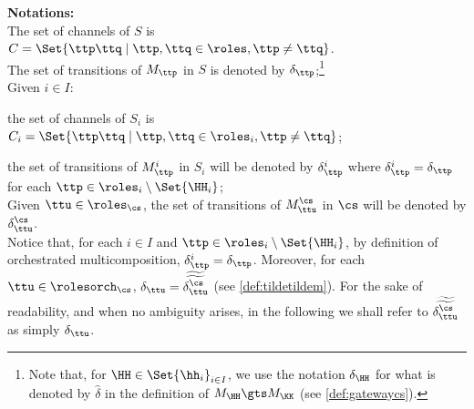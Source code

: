 
\medskip


\noindent
\textbf{Notations:} \\
The set of channels of $S$ is $C=\Set{\ttp\ttq \mid \ttp,\ttq\in \roles, \ttp\neq\ttq}$.\\
The set of transitions of $M_\ttp$ in $S$ is denoted by $\delta_\ttp$;\footnote{Note that,
for $\HH \in \Set{\hh_i}_{i\in I}$, we use the notation
$\delta_{\HH}$ for what is denoted by $\widehat\delta$ 
in the definition of $M_{\HH}\gts M_{\KK}$ (see \cref{def:gatewaycs}).}\\
Given $i\in I$:

the set of channels of $S_i$ is $C_i=\Set{\ttp\ttq \mid \ttp,\ttq\in \roles_i, \ttp\neq\ttq}$;

the set of transitions of $M^i_\ttp$ in $S_i$ will be denoted by $\delta^i_\ttp$
 where $\delta^i_\ttp = \delta_\ttp$ for each $\ttp\in\roles_i\setminus\Set{\HH_i}$;\\
Given $\ttu\in\roles_{\cs}$, the set of transitions of 
$M^{\cs}_{\ttu}$ in $\cs$ will be denoted by $\delta^\cs_{\ttu}$.\\

\noindent
Notice that, for each $i\in I$ and $\ttp\in\roles_i\setminus\Set{\HH_i}$, by definition of orchestrated multicomposition, $\delta^i_\ttp = \delta_\ttp$. 
 Moreover, for each $\ttu\in\rolesorch_{\cs}$, $\delta_\ttu = \widetilde{\widetilde{\delta^{\cs}_\ttu}}$ (see \cref{def:tildetildem}). For the sake of readability, and when no ambiguity arises,
in the following we shall refer to $\widetilde{\widetilde{\delta^{\cs}_\ttu}}$ as simply $\delta_\ttu$.



